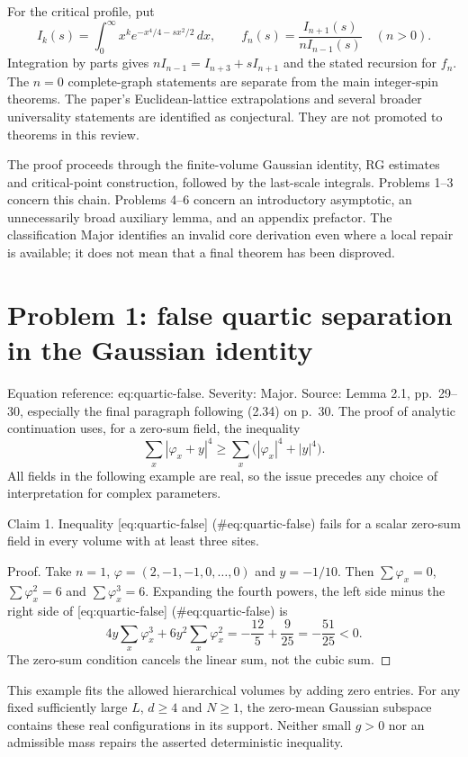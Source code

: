 \documentclass[10pt]{article}
\begin{document}
For the critical profile, put \[I_k(s)=\int_0^\infty x^k e^{-x^4/4-sx^2/2}\,dx,\qquad
 f_n(s)=\frac{I_{n+1}(s)}{nI_{n-1}(s)}\quad(n>0).\] Integration by parts gives \(nI_{n-1}=I_{n+3}+sI_{n+1}\) and the stated recursion for \(f_n\). The \(n=0\) complete-graph statements are separate from the main integer-spin theorems. The paper’s Euclidean-lattice extrapolations and several broader universality statements are identified as conjectural. They are not promoted to theorems in this review.\par
The proof proceeds through the finite-volume Gaussian identity, RG estimates and critical-point construction, followed by the last-scale integrals. Problems 1–3 concern this chain. Problems 4–6 concern an introductory asymptotic, an unnecessarily broad auxiliary lemma, and an appendix prefactor. The classification Major identifies an invalid core derivation even where a local repair is available; it does not mean that a final theorem has been disproved.\par
\section*{Problem 1: false quartic separation in the Gaussian identity}
Equation reference: eq:quartic-false. Severity: Major. Source: Lemma 2.1, pp. 29–30, especially the final paragraph following (2.34) on p. 30. The proof of analytic continuation uses, for a zero-sum field, the inequality \[
 \sum_x|\varphi_x+y|^4\geq
 \sum_x\bigl(|\varphi_x|^4+|y|^4\bigr).\] All fields in the following example are real, so the issue precedes any choice of interpretation for complex parameters.\par
Claim 1.  Inequality [eq:quartic-false] (\#eq:quartic-false) fails for a scalar zero-sum field in every volume with at least three sites.\par
Proof. Take \(n=1\), \(\varphi=(2,-1,-1,0,\ldots,0)\) and \(y=-1/10\). Then \(\sum\varphi_x=0\), \(\sum\varphi_x^2=6\) and \(\sum\varphi_x^3=6\). Expanding the fourth powers, the left side minus the right side of [eq:quartic-false] (\#eq:quartic-false) is \[4y\sum_x\varphi_x^3+6y^2\sum_x\varphi_x^2
       =-\frac{12}{5}+\frac9{25}=-\frac{51}{25}<0.\] The zero-sum condition cancels the linear sum, not the cubic sum. ◻\par
This example fits the allowed hierarchical volumes by adding zero entries. For any fixed sufficiently large \(L\), \(d\geq4\) and \(N\geq1\), the zero-mean Gaussian subspace contains these real configurations in its support. Neither small \(g>0\) nor an admissible mass repairs the asserted deterministic inequality.\par
\end{document}
